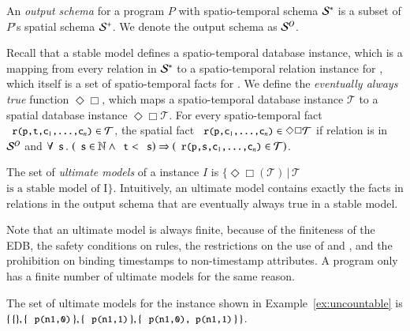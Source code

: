An {\em output schema} for a \lang program $P$ with spatio-temporal schema
$\mathcal{S}^*$ is a subset of $P$'s spatial schema $\mathcal{S}^+$.  We denote the output schema as
$\mathcal{S}^O$.

Recall that a stable model defines a spatio-temporal database instance, which is a mapping from every relation  in $\mathcal{S}^*$ to a spatio-temporal relation instance for , which itself is a set of spatio-temporal facts for .  We define the {\em eventually always true} function $\Diamond\Box$, which maps a spatio-temporal database instance $\mathcal{T}$ to a spatial database instance $\Diamond\Box\mathcal{T}$.  For every spatio-temporal fact $\dedalus{r(p,t,c\sub{1},\ldots,c\sub{n})} \in \mathcal{T}$, the spatial fact $\dedalus{r(p,c\sub{1},\ldots,c\sub{n})} \in \Diamond\Box\mathcal{T}$ if relation  is in $\mathcal{S}^O$ and $\forall \dedalus{s}\, . \, \left(\dedalus{s} \in \mathbb{N} \land \dedalus{t} < \dedalus{s}\right) \Rightarrow \left(\dedalus{r(p,s,c\sub{1},\ldots,c\sub{n})} \in \mathcal{T}\right)$.

The set of {\em ultimate models} of a \lang instance $I$ is $\{\Diamond\Box(\mathcal{T}) \, | \, \mathcal{T}$  $\text{is a stable model of I}\}$.  Intuitively, an ultimate model contains exactly the facts in relations in the output schema that are eventually always true in a stable model.

Note that an ultimate model is always finite, because of the finiteness of the EDB, the safety conditions on rules, the restrictions on the use of  and , and the prohibition on binding timestamps to non-timestamp attributes.  A \lang program only has a finite number of ultimate models for the same reason.

\begin{example}
The set of ultimate models for the \lang instance shown in Example~\ref{ex:uncountable} is $\{ \, \{\}, \{ \, \dedalus{p(n1,0)} \, \}, \{ \, \dedalus{p(n1,1)} \, \}, \{ \, \dedalus{p(n1,0), p(n1,1)} \, \} \, \}$.
\end{example}



